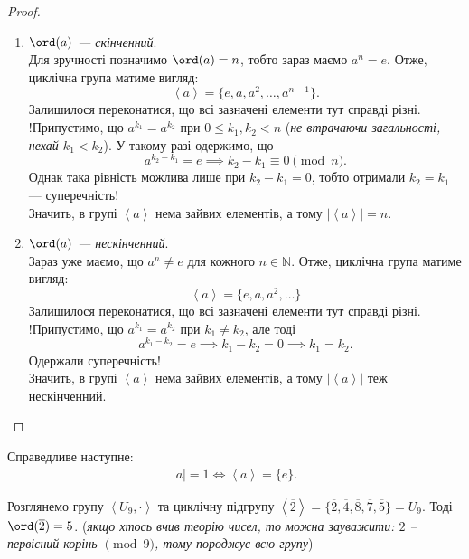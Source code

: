 \documentclass{math_library}
\begin{document}
\begin{proof}
\begin{enumerate}[topsep=0pt,wide=0pt,label={\Roman*.}]
\item \textit{$\ord(a)$ --- скінченний}.\\
Для зручності позначимо $\ord(a) = n$, тобто зараз маємо $a^n = e$. Отже, циклічна група матиме вигляд:
\[
\left<a\right> = \{e,a,a^2,\dots,a^{n-1}\}.
\]
Залишилося переконатися, що всі зазначені елементи тут справді різні.\\
!Припустимо, що $a^{k_1} = a^{k_2}$ при $0 \leq k_1,k_2 < n$ (\textit{не втрачаючи загальності, нехай $k_1 < k_2$}). У такому разі одержимо, що
\[
a^{k_2-k_1} = e \implies k_2-k_1 \equiv 0 \pmod n.
\]
Однак така рівність можлива лише при $k_2 - k_1 = 0$, тобто отримали $k_2 = k_1$ --- суперечність!\\
Значить, в групі $\left<a\right>$ нема зайвих елементів, а тому $|\left<a\right>| = n$.

\item \textit{$\ord(a)$ --- нескінченний}.\\
Зараз уже маємо, що $a^n \neq e$ для кожного $n \in \mathbb{N}$. Отже, циклічна група матиме вигляд:
\[
\left<a\right> = \{ e,a,a^2,\dots \}
\]
Залишилося переконатися, що всі зазначені елементи тут справді різні.\\
!Припустимо, що $a^{k_1} = a^{k_2}$ при $k_1 \neq k_2$, але тоді
\[ 
a^{k_1-k_2} = e \implies k_1-k_2 = 0 \implies k_1 = k_2.
\]
Одержали суперечність!\\
Значить, в групі $\left<a\right>$ нема зайвих елементів, а тому $|\left<a\right>|$ теж нескінченний. \qedhere
\end{enumerate}
\end{proof}

\begin{remark}
Справедливе наступне:
\begin{align*}
|a| = 1 \iff \left<a\right> = \{e\}.
\end{align*}
\end{remark}

\begin{example}
Розглянемо групу $\left< U_9, \cdot \right>$ та циклічну підгрупу $\left<\overline{2}\right> = \{ \overline{2}, \overline{4}, \overline{8}, \overline{7}, \overline{5} \} = U_9$. Тоді $\ord (\overline{2}) = 5$. (\textit{якщо хтось вчив теорію чисел, то можна зауважити: $2$ -- первісний корінь $\pmod 9$, тому породжує всю групу})
\end{example}
\end{document}
